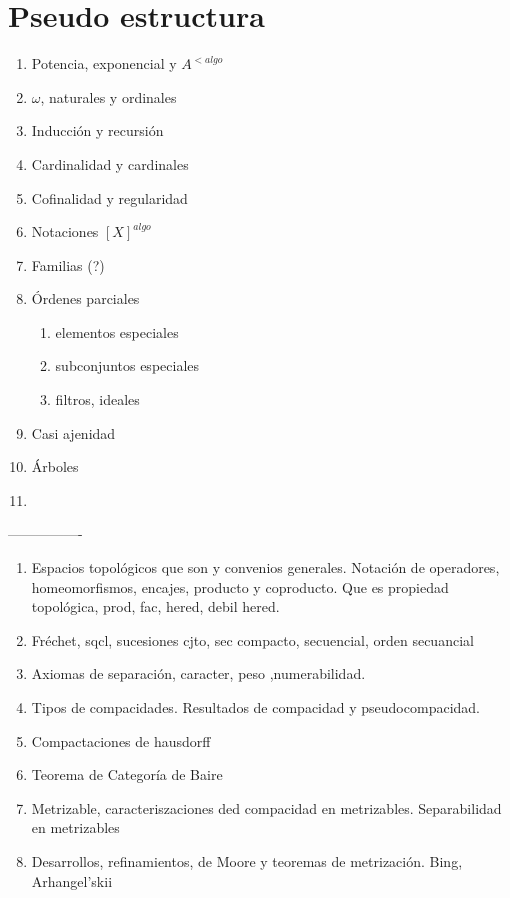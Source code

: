 \documentclass[letterpaper,DIV=12,12pt]{scrbook}
\begin{document}
    \chapter*{Pseudo estructura}
        \begin{enumerate}
            \item Potencia, exponencial y $A^{< algo}$
            \item $\omega$, naturales y ordinales
            \item Inducción y recursión
            \item Cardinalidad y cardinales
            \item Cofinalidad y regularidad
            \item Notaciones $[X]^{algo}$
            \item Familias (?)
            \item Órdenes parciales
            \begin{enumerate}
                \item elementos especiales
                \item subconjuntos especiales
                \item filtros, ideales
            \end{enumerate}
            \item Casi ajenidad
            \item Árboles
            \item 
        \end{enumerate}
        ----------------
        \begin{enumerate}
            \item Espacios topológicos que son y convenios generales. Notación de operadores, homeomorfismos, encajes, producto y coproducto. Que es propiedad topológica, prod, fac, hered, debil hered.
            \item Fréchet, sqcl, sucesiones cjto, sec compacto, secuencial, orden secuancial
            \item Axiomas de separación, caracter, peso ,numerabilidad.
            \item Tipos de compacidades. Resultados de compacidad y pseudocompacidad.
            \item Compactaciones de hausdorff
            \item Teorema de Categoría de Baire
            \item Metrizable, caracteriszaciones ded compacidad en metrizables. Separabilidad en metrizables
            \item Desarrollos, refinamientos, de Moore y teoremas de metrización. Bing, Arhangel'skii
        \end{enumerate}
\end{document}
